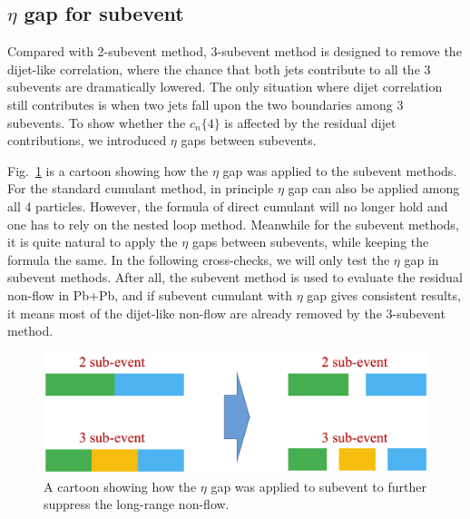 \subsection{$\eta$ gap for subevent}
Compared with 2-subevent method, 3-subevent method is designed to remove the dijet-like correlation, where the chance that both jets contribute to all the 3 subevents are dramatically lowered. The only situation where dijet correlation still contributes is when two jets fall upon the two boundaries among 3 subevents. To show whether the $c_n\{4\}$ is affected by the residual dijet contributions, we introduced $\eta$ gaps between subevents.

Fig.~\ref{fig:sys_etaGap_eg} is a cartoon showing how the $\eta$ gap was applied to the subevent methods. For the standard cumulant method, in principle $\eta$ gap can also be applied among all 4 particles. However, the formula of direct cumulant will no longer hold and one has to rely on the nested loop method. Meanwhile for the subevent methods, it is quite natural to apply the $\eta$ gaps between subevents, while keeping the formula the same. In the following cross-checks, we will only test the $\eta$ gap in subevent methods. After all, the subevent method is used to evaluate the residual non-flow in Pb+Pb, and if subevent cumulant with $\eta$ gap gives consistent results, it means most of the dijet-like non-flow are already removed by the 3-subevent method.

\begin{figure}[H]
\centering
\includegraphics[width=.9\linewidth]{figs/sec_sys/etaGap_eg.png}
\caption{A cartoon showing how the $\eta$ gap was applied to subevent to further suppress the long-range non-flow.}
\label{fig:sys_etaGap_eg}
\end{figure}

